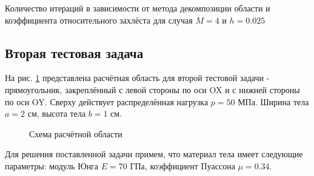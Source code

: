\documentclass[a4paper]{article}
\begin{document}
\begin{table}[h]
\caption{Количество итераций в зависимости от метода декомпозиции области и коэффициента относительного захлёста для случая $M = 4$ и $h = 0.025$}
\label{table:task_01_iters_overlap}
\end{table}

\newpage

\subsection{Вторая тестовая задача}

На рис. \ref{fig:task_02_scheme} представлена расчётная область для второй тестовой задачи - прямоугольник, закреплённый с левой стороны по оси OX и с нижней стороны по оси OY. Сверху действует распределённая нагрузка $p = 50$ МПа. Ширина тела $a = 2$ см, высота тела $b = 1$ см.

\begin{figure}[h]
\caption{Схема расчётной области}
\label{fig:task_02_scheme}
\end{figure}

Для решения поставленной задачи примем, что материал тела имеет следующие параметры: модуль Юнга $E = 70$ ГПа, коэффициент Пуассона $\mu = 0.34$. 
\end{document}
